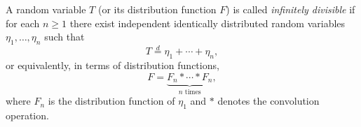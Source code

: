 A random variable $T$ (or its distribution function $F$) is called \textit{infinitely divisible} if for each $n \geq 1$ there exist independent identically distributed random variables $\eta_1, \ldots, \eta_n$ such that
$$T \stackrel{d}{=} \eta_1 + \cdots + \eta_n,$$
or equivalently, in terms of distribution functions,
$$F = \underbrace{F_n * \cdots * F_n}_{n\text{ times}},$$
where $F_n$ is the distribution function of $\eta_1$ and $*$ denotes the convolution operation.
